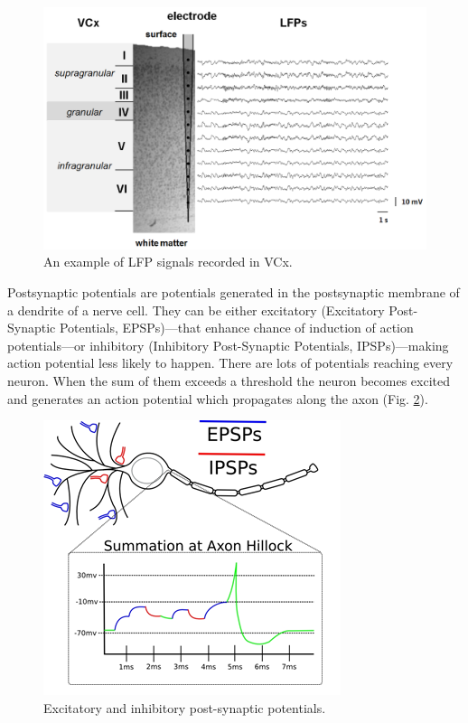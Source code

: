 \documentclass{pracalicmgr}
\begin{document}
   \begin{figure}[H]
   	\begin{center}
   		\includegraphics[scale=0.5]{VCx_LFPs2.png}
   	\end{center}
   	\caption{ An example of LFP signals recorded in VCx.}
   	\label{rys:VCx_LFPs}
   \end{figure} 
   
   Postsynaptic potentials are potentials generated in the postsynaptic membrane of a dendrite of a nerve cell. They can be either excitatory (Excitatory Post-Synaptic Potentials, EPSPs)---that enhance chance of induction of action potentials---or inhibitory (Inhibitory Post-Synaptic Potentials, IPSPs)---making action potential less likely to happen. There are lots of potentials reaching every neuron. When the sum of them exceeds a threshold the neuron becomes excited and generates an action potential which propagates along the axon (Fig. \ref{rys:PSPs}).
   \begin{figure}[htbp]
   	\begin{center}
   		\includegraphics[scale=1]{PSPs.png}
   	\end{center}
   	\caption{Excitatory and inhibitory post-synaptic potentials.}
   	\label{rys:PSPs}
   \end{figure} 
   
\end{document}
